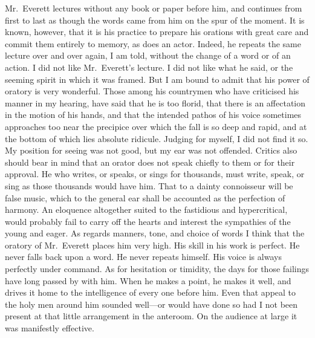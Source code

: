 Mr.\ Everett lectures without any book or paper before him, and
continues from first to last as though the words came from him on
the spur of the moment.  It is known, however, that it is his
practice to prepare his orations with great care and commit them
entirely to memory, as does an actor.  Indeed, he repeats the same
lecture over and over again, I am told, without the change of a
word or of an action.  I did not like Mr.\ Everett's lecture.  I did
not like what he said, or the seeming spirit in which it was
framed.  But I am bound to admit that his power of oratory is very
wonderful.  Those among his countrymen who have criticised his
manner in my hearing, have said that he is too florid, that there
is an affectation in the motion of his hands, and that the intended
pathos of his voice sometimes approaches too near the precipice
over which the fall is so deep and rapid, and at the bottom of
which lies absolute ridicule.  Judging for myself, I did not find
it so.  My position for seeing was not good, but my ear was not
offended.  Critics also should bear in mind that an orator does not
speak chiefly to them or for their approval.  He who writes, or
speaks, or sings for thousands, must write, speak, or sing as those
thousands would have him.  That to a dainty connoisseur will be
false music, which to the general ear shall be accounted as the
perfection of harmony.  An eloquence altogether suited to the
fastidious and hypercritical, would probably fail to carry off the
hearts and interest the sympathies of the young and eager.  As
regards manners, tone, and choice of words I think that the oratory
of Mr.\ Everett places him very high.  His skill in his work is
perfect.  He never falls back upon a word.  He never repeats
himself.  His voice is always perfectly under command.  As for
hesitation or timidity, the days for those failings have long
passed by with him.  When he makes a point, he makes it well, and
drives it home to the intelligence of every one before him.  Even
that appeal to the holy men around him sounded well---or would have
done so had I not been present at that little arrangement in the
anteroom.  On the audience at large it was manifestly effective.

